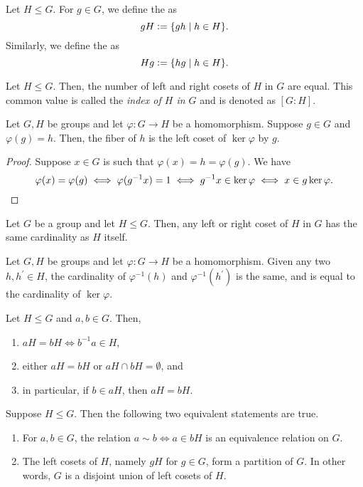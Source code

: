 \begin{defn}
    Let $H \leq G$. For $g \in G$, we define the  as
    \[
        gH \vcentcolon= \{ gh \mid h \in H \} .
    \]
    Similarly, we define the  as 
    \[
        Hg \vcentcolon= \{ hg \mid h \in H \}.
    \]
\end{defn}
\begin{prop} \label{prop:index}
    Let $H \leq G$. Then, the number of left and right cosets of $H$ in $G$ are equal. This common value is called the \emph{index of $H$ in $G$} and is denoted as $[G:H]$.
\end{prop}
\begin{prop} \label{prop:fiber-left-coset-of-kernel}
    Let $G,H$ be groups and let $\varphi \colon G \to H$ be a homomorphism. Suppose $g \in G$ and $\varphi(g) = h$. Then, the fiber of $h$ is the left coset of $\ker\varphi$ by $g$.
\end{prop}
\begin{proof}
    Suppose $x \in G$ is such that $\varphi(x) = h = \varphi(g)$. We have
    \[
        \varphi(x) = \varphi(g) \iff \varphi(g^{-1}x) = 1 \iff g^{-1}x \in \ker\varphi \iff x \in g\ker\varphi. \qedhere
    \]
\end{proof}
\begin{prop} \label{prop:coset-same-cardinality}
    Let $G$ be a group and let $H \leq G$. Then, any left or right coset of $H$ in $G$ has the same cardinality as $H$ itself.
\end{prop}
\begin{cor} \label{cor:fiber-same-cardinality}
    Let $G,H$ be groups and let $\varphi \colon G \to H$ be a homomorphism. Given any two $h,h^{\prime} \in H$, the cardinality of $\varphi^{-1}(h)$ and $\varphi^{-1}(h^{\prime})$ is the same, and is equal to the cardinality of $\ker\varphi$. 
\end{cor}   
\begin{prop} \label{prop:coset-basics}
    Let $H \leq G$ and $a,b \in G$. Then,
    \begin{enumerate}
        \item $aH = bH \iff b^{-1}a \in H$,
        \item either $aH = bH$ or $aH \cap bH = \emptyset$, and
        \item in particular, if $b \in aH$, then $aH = bH$.
    \end{enumerate}
\end{prop}
\begin{prop} \label{prop:cosets-partition}
    Suppose $H \leq G$. Then the following two equivalent statements are true.
    \begin{enumerate}
        \item For $a,b \in G$, the relation $a \sim b \iff a \in bH$ is an equivalence relation on $G$.
        \item The left cosets of $H$, namely $gH$ for $g \in G$, form a partition of $G$. In other words, $G$ is a disjoint union of left cosets of $H$.
    \end{enumerate}
\end{prop}
